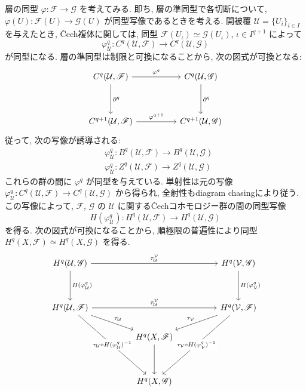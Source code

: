 \documentclass[a4paper,10pt,dvipdfmx]{jsreport}
\theoremstyle{definition}
\begin{document}
層の同型 \(\varphi \colon \mathscr{F} \to \mathscr{G}\) を考えてみる. 即ち, 層の準同型で各切断について, \(\varphi(U) \colon \mathscr{F}(U) \to \mathscr{G}(U)\) が同型写像であるときを考える. 開被覆 \(\mathcal{U} = \{U_i\}_{i\in I}\) を与えたとき, \v{C}ech複体に関しては, 同型 \(\mathscr{F}(U_\iota) \simeq \mathscr{G}(U_\iota)\), \(\iota \in I^{q+1}\) によって
\[
    \varphi^q_\mathcal{U} \colon C^q(\mathcal{U},\mathscr{F}) \to C^q(\mathcal{U},\mathscr{G})
\]
が同型になる. 層の準同型は制限と可換になることから, 次の図式が可換となる:
\[\begin{tikzcd}
	{C^q(\mathcal{U},\mathscr{F})} && {C^q(\mathcal{U},\mathscr{G})} \\
	\\
	{C^{q+1}(\mathcal{U},\mathscr{F})} && {C^{q+1}(\mathcal{U},\mathscr{G})}
	\arrow["{\partial^{q}}", from=1-1, to=3-1]
	\arrow["{\partial^{q}}", from=1-3, to=3-3]
	\arrow["{\varphi^{q+1}}", from=3-1, to=3-3]
	\arrow["{\varphi^q}", from=1-1, to=1-3]
\end{tikzcd}\]
従って, 次の写像が誘導される:
\begin{align}
    & \varphi^q_\mathcal{U} \colon B^q(\mathcal{U},\mathscr{F}) \to B^q(\mathcal{U},\mathscr{G}) \label{map:isomorphism between coboundary groups}\\
    & \varphi^q_\mathcal{U} \colon Z^q(\mathcal{U},\mathscr{F}) \to Z^q(\mathcal{U},\mathscr{G}) \label{map:isomorphism between cochain groups}
\end{align}
これらの群の間に \(\varphi^q\) が同型を与えている. 単射性は元の写像 \(\varphi^q_\mathcal{U} \colon C^q(\mathcal{U},\mathscr{F}) \to C^q(\mathcal{U},\mathscr{G})\) から得られ, 全射性もdiagram chasingにより従う. この写像によって, \(\mathscr{F}\), \(\mathscr{G}\) の \(\mathcal{U}\) に関する\v{C}echコホモロジー群の間の同型写像
\[
    H(\varphi^q_\mathcal{U}) \colon H^q(\mathcal{U},\mathscr{F}) \to H^q(\mathcal{U},\mathscr{G})
\]
を得る. 次の図式が可換になることから, 順極限の普遍性により同型 \(H^q(X,\mathscr{F}) \simeq H^q(X,\mathscr{G})\) を得る.
\[\begin{tikzcd}
	{H^q(\mathcal{U},\mathscr{G})} &&&& {H^q(\mathcal{V},\mathscr{G})} \\
	\\
	{H^q(\mathcal{U},\mathscr{F})} &&&& {H^q(\mathcal{V},\mathscr{F})} \\
	&& {H^q(X,\mathscr{F})} \\
	\\
	&& {H^q(X,\mathscr{G})}
	\arrow[from=4-3, to=6-3]
	\arrow["{\tau_\mathcal{U}^\mathcal{V}}", from=3-1, to=3-5]
	\arrow["{\tau_\mathcal{U} \circ H(\varphi^q_\mathcal{U})^{-1}}"{description}, from=3-1, to=6-3]
	\arrow["{\tau_\mathcal{U}}", from=3-1, to=4-3]
	\arrow["{\tau_\mathcal{V}}"', from=3-5, to=4-3]
	\arrow["{\tau_\mathcal{V} \circ H(\varphi^q_\mathcal{V})^{-1}}"{description}, from=3-5, to=6-3]
	\arrow["{\tau_\mathcal{U}^\mathcal{V}}", from=1-1, to=1-5]
	\arrow["{H(\varphi^q_\mathcal{U})}", from=1-1, to=3-1]
	\arrow["{H(\varphi^q_\mathcal{V})}", from=1-5, to=3-5]
\end{tikzcd}\]
\end{document}
